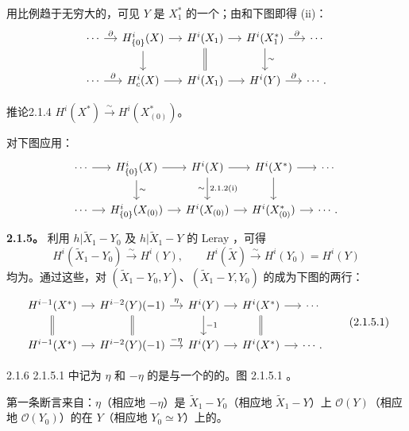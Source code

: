 用比例趋于无穷大的，可见 $Y$ 是 $X_1^*$ 的一个；由和下图即得 (ii)：
\[
\begin{tikzcd}[column sep=small]
\cdots\arrow[r,"\partial"]&H^i_{\{0\}}(X)\arrow[r]\arrow[d]&H^i(X_1)\arrow[r]\arrow[d,equal]&H^i(X_1^*)\arrow[r,"\partial"]\arrow[d,"\sim"]&\cdots\\
\cdots\arrow[r,"\partial"]&H_c^i(X)\arrow[r]&H^i(X_1)\arrow[r]&H^i(Y)\arrow[r,"\partial"]&\cdots .
\end{tikzcd}
\]
\begin{SGAresult}{推论}{2.1.4}
$H^i(X^*)\xrightarrow{\sim}H^i(X^*_{(0)})$。
\end{SGAresult}
对下图应用：
\[
\begin{tikzcd}[column sep=small]
\cdots\arrow[r]&H^i_{\{0\}}(X)\arrow[r]\arrow[d,"\sim"]&H^i(X)\arrow[r]\arrow[d,"{\text{2.1.2(i)}}","\sim"']&H^i(X^*)\arrow[r]\arrow[d]&\cdots\\
\cdots\arrow[r]&H^i_{\{0\}}(X_{(0)})\arrow[r]&H^i(X_{(0)})\arrow[r]&H^i(X^*_{(0)})\arrow[r]&\cdots .
\end{tikzcd}
\]
\textbf{2.1.5。} 利用 $h|\widetilde X_1-Y_0$ 及 $h|\widetilde X_1-Y$ 的 Leray ，可得
\[
 H^i(\widetilde X_1-Y_0)\xrightarrow{\sim}H^i(Y),\qquad
 H^i(\widetilde X)\xrightarrow{\sim}H^i(Y_0)=H^i(Y)
\]
均为。通过这些，对 $(\widetilde X_1-Y_0,Y)$、$(\widetilde X_1-Y,Y_0)$ 的成为下图的两行：
\[
\begin{tikzcd}[column sep=small]
H^{i-1}(X^*)\arrow[r]\arrow[d,equal]&H^{i-2}(Y)(-1)\arrow[r,"\eta"]\arrow[d,equal]&H^i(Y)\arrow[r]\arrow[d,"-1"]&H^i(X^*)\arrow[r]\arrow[d,equal]&\cdots\\
H^{i-1}(X^*)\arrow[r]&H^{i-2}(Y)(-1)\arrow[r,"-\eta"]&H^i(Y)\arrow[r]&H^i(X^*)\arrow[r]&\cdots .
\end{tikzcd}\tag{2.1.5.1}
\]
\begin{SGAresult}{}{2.1.6}
2.1.5.1 中记为 $\eta$ 和 $-\eta$ 的是与一个的的。图 2.1.5.1 。
\end{SGAresult}
第一条断言来自：$\eta$（相应地 $-\eta$）是 $\widetilde X_1-Y_0$（相应地 $\widetilde X_1-Y$）上 $\mathscr O(Y)$（相应地 $\mathscr O(Y_0)$）的在 $Y$（相应地 $Y_0\simeq Y$）上的。

